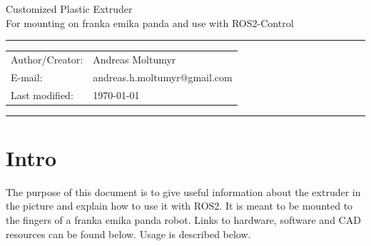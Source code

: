 \documentclass[10pt]{article}
\begin{document}
\begin{center}
{\huge Customized Plastic Extruder}\\
\vspace{0.2cm}
{\large For mounting on franka emika panda and use with ROS2-Control}\\
\vspace{0.4cm}
\hrule
\vspace{0.0cm}
{%
\setlength\tabcolsep{6pt} %
\begin{tabular}{ll}
	Author/Creator: & Andreas Moltumyr \\
	E-mail: & andreas.h.moltumyr@gmail.com \\
	Last modified: & \today
\end{tabular}
}%
\vspace{0.2cm}
\hrule
\vspace{1.5cm}
\end{center}

\section{Intro}
The purpose of this document is to give useful information about the extruder in the picture and explain how to use it with ROS2. It is meant to be mounted to the fingers of a franka emika panda robot.  Links to hardware, software and CAD resources can be found below. Usage is described below.
\end{document}
